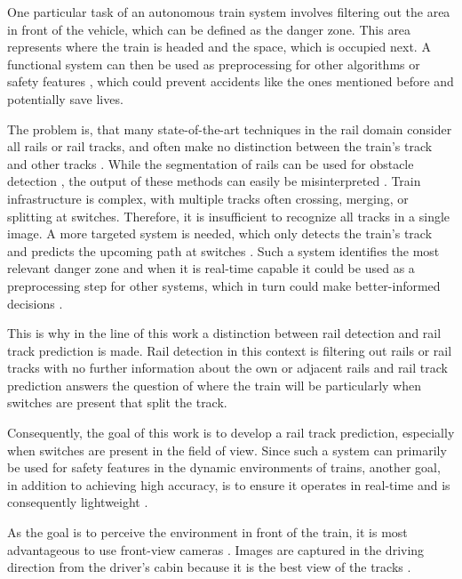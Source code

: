 One particular task of an autonomous train system involves filtering out the area in front of the vehicle, which can be defined as the danger zone.
This area represents where the train is headed and the space, which is occupied next.
A functional system can then be used as preprocessing for other algorithms or safety features \cite{railNet2019}, which could prevent accidents like the ones mentioned before and potentially save lives.

The problem is, that many state-of-the-art techniques in the rail domain consider all rails or rail tracks, and often make no distinction between the train's track and other tracks \cite{tepNet2024}.
While the segmentation of rails can be used for obstacle detection \cite{railNet2019}, the output of these methods can easily be misinterpreted \cite{tepNet2024}.
Train infrastructure is complex, with multiple tracks often crossing, merging, or splitting at switches. Therefore, it is insufficient to recognize all tracks in a single image.
A more targeted system is needed, which only detects the train's track and predicts the upcoming path at switches \cite{tepNet2024}.
Such a system identifies the most relevant danger zone and when it is real-time capable it could be used as a preprocessing step for other systems, which in turn could make better-informed decisions \cite{tepNet2024}.

This is why in the line of this work a distinction between rail detection and rail track prediction is made.
Rail detection in this context is filtering out rails or rail tracks with no further information about the own or adjacent rails and rail track prediction answers the question of where the train will be particularly when switches are present that split the track.

Consequently, the goal of this work is to develop a rail track prediction, especially when switches are present in the field of view.
Since such a system can primarily be used for safety features in the dynamic environments of trains, another goal, in addition to achieving high accuracy, is to ensure it operates in real-time and is consequently lightweight \cite{tepNet2024}.

As the goal is to perceive the environment in front of the train, it is most advantageous to use front-view cameras \cite{tepNet2024} \cite{railNet2019}.
Images are captured in the driving direction from the driver's cabin because it is the best view of the tracks \cite{tepNet2024}.

